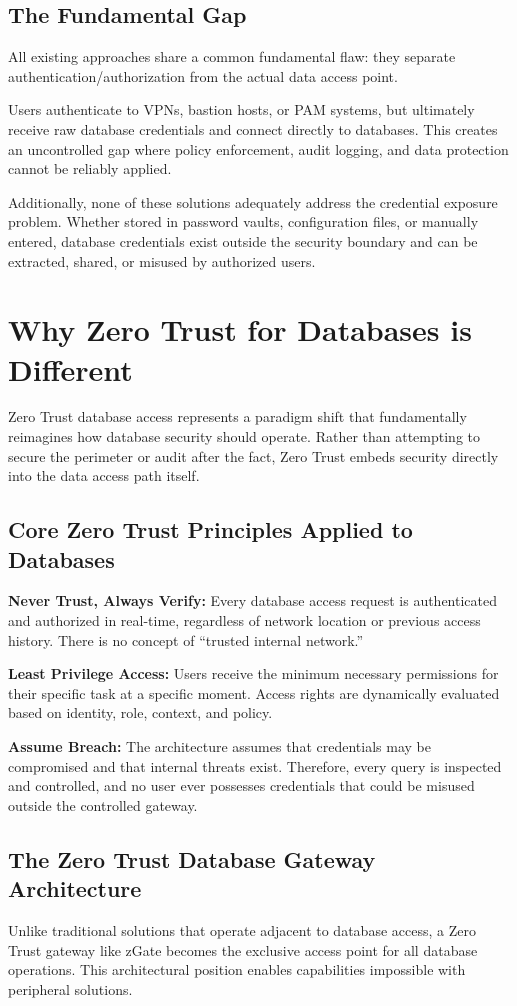 \subsection{The Fundamental Gap}
All existing approaches share a common fundamental flaw: they separate authentication/authorization from the actual data access point.

Users authenticate to VPNs, bastion hosts, or PAM systems, but ultimately receive raw database credentials and connect directly to databases. This creates an uncontrolled gap where policy enforcement, audit logging, and data protection cannot be reliably applied.

Additionally, none of these solutions adequately address the credential exposure problem. Whether stored in password vaults, configuration files, or manually entered, database credentials exist outside the security boundary and can be extracted, shared, or misused by authorized users.

\section{Why Zero Trust for Databases is Different}
Zero Trust database access represents a paradigm shift that fundamentally reimagines how database security should operate. Rather than attempting to secure the perimeter or audit after the fact, Zero Trust embeds security directly into the data access path itself.

\subsection{Core Zero Trust Principles Applied to Databases}
\textbf{Never Trust, Always Verify:} Every database access request is authenticated and authorized in real-time, regardless of network location or previous access history. There is no concept of ``trusted internal network.''

\textbf{Least Privilege Access:} Users receive the minimum necessary permissions for their specific task at a specific moment. Access rights are dynamically evaluated based on identity, role, context, and policy.

\textbf{Assume Breach:} The architecture assumes that credentials may be compromised and that internal threats exist. Therefore, every query is inspected and controlled, and no user ever possesses credentials that could be misused outside the controlled gateway.

\subsection{The Zero Trust Database Gateway Architecture}
Unlike traditional solutions that operate adjacent to database access, a Zero Trust gateway like zGate becomes the exclusive access point for all database operations. This architectural position enables capabilities impossible with peripheral solutions.


